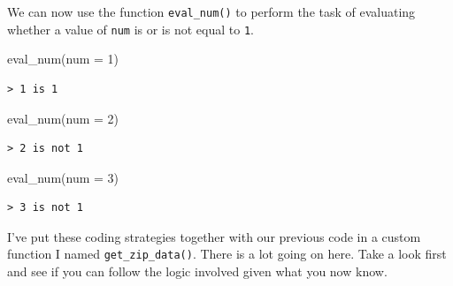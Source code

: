 \documentclass[
  letterpaper,
]{latex/krantz}
\newenvironment{Shaded}{\begin{snugshade}}{\end{snugshade}}
\newcommand{\AttributeTok}[1]{\textcolor[rgb]{0.00,0.00,0.00}{#1}}
\newcommand{\DecValTok}[1]{\textcolor[rgb]{0.00,0.00,0.00}{#1}}
\newcommand{\FunctionTok}[1]{\textcolor[rgb]{0.00,0.00,0.00}{#1}}
\newcommand{\NormalTok}[1]{\textcolor[rgb]{0.00,0.00,0.00}{#1}}
\begin{document}
We can now use the function \texttt{eval\_num()} to perform the task of
evaluating whether a value of \texttt{num} is or is not equal to
\texttt{1}.

\begin{Shaded}
\begin{Highlighting}[]
\FunctionTok{eval\_num}\NormalTok{(}\AttributeTok{num =} \DecValTok{1}\NormalTok{)}
\end{Highlighting}
\end{Shaded}

\begin{verbatim}
> 1 is 1
\end{verbatim}

\begin{Shaded}
\begin{Highlighting}[]
\FunctionTok{eval\_num}\NormalTok{(}\AttributeTok{num =} \DecValTok{2}\NormalTok{)}
\end{Highlighting}
\end{Shaded}

\begin{verbatim}
> 2 is not 1
\end{verbatim}

\begin{Shaded}
\begin{Highlighting}[]
\FunctionTok{eval\_num}\NormalTok{(}\AttributeTok{num =} \DecValTok{3}\NormalTok{)}
\end{Highlighting}
\end{Shaded}

\begin{verbatim}
> 3 is not 1
\end{verbatim}

I've put these coding strategies together with our previous code in a
custom function I named \texttt{get\_zip\_data()}. There is a lot going
on here. Take a look first and see if you can follow the logic involved
given what you now know.
\end{document}
